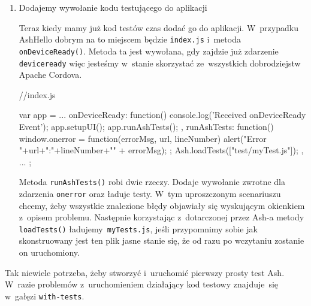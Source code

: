 \documentclass[brudnopis]{xmgr}
\begin{document}
\begin{enumerate}
\begin{javascriptcode}
{      //jesli aplikacja dotarła tutaj,
      //  to zaliczmy ten przypadek testowy
      Ash.endTest();
    });
\end{javascriptcode}

Powyższy kod nie jest bardziej skomplikowany od poprzedniego. Jedyną nowością jest zastosowanie wielu bloków 

\begin{quote}
  \texttt{then(function(){ ... })}
\end{quote}

które są wykonywane jeden po drugim w~kolejności podania i~pozwalają nam łączyć mniejsze funkcje testujace w~bardziej złożone bloki.

 \item Dodajemy wywołanie kodu testującego do aplikacji

Teraz kiedy mamy już kod testów czas dodać go do aplikacji. W~przypadku AshHello dobrym na to miejscem będzie \texttt{index.js} i~metoda \mbox{\texttt{onDeviceReady()}}. Metoda ta jest wywołana, gdy zajdzie już zdarzenie \texttt{deviceready} więc jesteśmy w~stanie skorzystać ze~wszystkich dobrodziejstw Apache Cordova.

 \begin{javascriptcode}
  //index.js
  
  var app = {
	...
    onDeviceReady: function() {
        console.log('Received onDeviceReady Event');
        app.setupUI();
        app.runAshTests();
    },
    runAshTests: function() {
        window.onerror = function(errorMsg, url, lineNumber) {
            alert("Error "+url+":"+lineNumber+"\n" + errorMsg);
        };
        Ash.loadTests(["test/myTest.js"]);
    },
	...
  };

\end{javascriptcode}

Metoda \texttt{runAshTests()} robi dwie rzeczy. Dodaje wywołanie zwrotne dla zdarzenia \texttt{onerror} oraz ładuje testy. W~tym uproszczonym scenariuszu chcemy, żeby wszystkie znalezione błędy objawiały się wyskującym okienkiem z~opisem problemu. Następnie korzystając z~dotarczonej przez Ash-a metody \texttt{loadTests()} ładujemy\texttt{ myTests.js}, jeśli przypomnimy sobie jak skonstruowany jest ten plik jasne stanie się, że od razu po wczytaniu zostanie on uruchomiony. 

\end{enumerate}

Tak niewiele potrzeba, żeby stworzyć i~uruchomić pierwszy prosty test Ash. W~razie problemów z~uruchomieniem działający kod testowy znajduje~się w~gałęzi \texttt{with-tests}.
\end{document}
